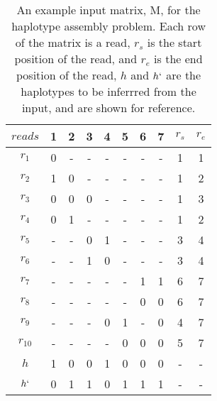 \documentclass[10pt,a4paer,twocolumn]{article}
\begin{document}
\begin{table}[h!]
\centering
\caption{An example input matrix, M, for the haplotype assembly problem. Each row of the matrix is a read, 
        $r_s$ is the start position of the read, and $r_e$ is the end position of the read, $h$ and $h`$ are
        the haplotypes to be inferrred from the input, and are shown for reference.}
        \vspace{0.2cm}
\label{tab:exinp}   
\begin{tabular}{c c c c c c c c c c}
    \hline 
    $reads$     & 1     & 2     & 3     & 4     & 5     & 6     & 7     & $r_s$     & $r_e$         \\
    \hline
    $r_1$       & 0     & -     & -     & -     & -     & -     & -     & 1         & 1             \\
    $r_2$       & 1     & 0     & -     & -     & -     & -     & -     & 1         & 2             \\
    $r_3$       & 0     & 0     & 0     & -     & -     & -     & -     & 1         & 3             \\
    $r_4$       & 0     & 1     & -     & -     & -     & -     & -     & 1         & 2             \\
    $r_5$       & -     & -     & 0     & 1     & -     & -     & -     & 3         & 4             \\
    $r_6$       & -     & -     & 1     & 0     & -     & -     & -     & 3         & 4             \\
    $r_7$       & -     & -     & -     & -     & -     & 1     & 1     & 6         & 7             \\
    $r_8$       & -     & -     & -     & -     & -     & 0     & 0     & 6         & 7             \\
    $r_9$       & -     & -     & -     & 0     & 1     & -     & 0     & 4         & 7             \\
    $r_10$      & -     & -     & -     & -     & 0     & 0     & 0     & 5         & 7             \\
    \hline                                                                                          
    \hline                                                                                          
    $h$         & 1     & 0     & 0     & 1     & 0     & 0     & 0     & -         & -               \\
    $h`$        & 0     & 1     & 1     & 0     & 1     & 1     & 1     & -         & -               \\
    \hline
\end{tabular}
\end{table}
\end{document}
